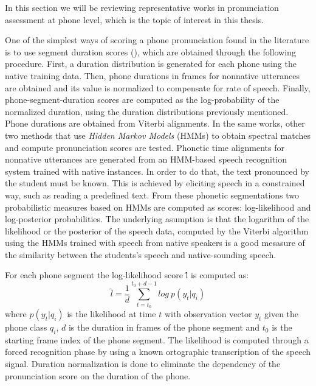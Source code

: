 In this section we will be reviewing representative works in pronunciation assessment
at phone level, which is the topic of interest in this thesis.

One of the simplest ways of scoring a phone pronunciation found in the literature
is to use segment duration scores (\cite{pronunciation_scoring_instruction, pronunciation_scoring_phone_segments_instruction}), which are obtained through the following
procedure. First, a duration distribution is generated for each phone
using the native training data.
Then, phone durations in frames for nonnative utterances are obtained
and its value is normalized to compensate for rate of speech.
Finally, phone-segment-duration scores are computed as
the log-probability of the normalized duration, using the duration
distributions previously mentioned. Phone durations are obtained from Viterbi alignments.
In the same works, other two methods that use \textit{Hidden Markov Models} (HMMs) to obtain
spectral matches and compute pronunciation scores are tested.
Phonetic time alignments for
nonnative utterances are generated from an HMM-based speech recognition system trained
with native instances. In order to do that, the text pronounced by the student
must be known. This is achieved by eliciting speech in a
constrained way, such as reading a predefined text.
From these phonetic segmentations two
probabilistic measures based on HMMs are computed as scores: log-likelihood and
log-posterior probabilities. The underlying asumption is that the logarithm of the likelihood
or the posterior of the speech data, computed by the Viterbi
algorithm using the HMMs trained with speech from native
speakers is a good mesasure of the similarity between the students's
speech and native-sounding speech.

For each phone segment the log-likelihood score \^{l} is computed as:
\begin{equation}
\label{eq:logLikelihood}
\hat{l} = \frac{1}{d} \sum_{t=t_{0}}^{t_{0}+d-1} log \ p(y_{t}|q_{i})
\end{equation}
where $p(y_{t}|q_{i})$ is the likelihood at time $t$ with observation vector $y_{t}$
given the phone class $q_{i}$, $d$ is the duration in frames of the phone segment
and $t_{0}$ is the starting frame index of the phone segment.
The likelihood is computed through a forced recognition phase by using a known ortographic
transcription of the speech signal. Duration normalization is done to
eliminate the dependency of the pronunciation score on the duration of the phone.

